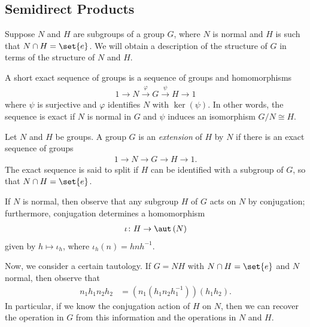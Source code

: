 \documentclass[10pt]{mypackage}
\begin{document}
\subsection{Semidirect Products}%
Suppose $N$ and $H$ are subgroups of a group $G$, where $N$ is normal and $H$ is such that $N\cap H = \set{e}$. We will obtain a description of the structure of $G$ in terms of the structure of $N$ and $H$.

A short exact sequence of groups is a sequence of groups and homomorphisms
\begin{align*}
  1 \rightarrow N \xrightarrow{\varphi} G \xrightarrow{\psi} H \rightarrow 1
\end{align*}
where $\psi$ is surjective and $\varphi$ identifies $N$ with $\ker\left( \psi \right)$. In other words, the sequence is exact if $N$ is normal in $G$ and $\psi$ induces an isomorphism $G/N\cong H$.
\begin{definition}
  Let $N$ and $H$ be groups. A group $G$ is an \textit{extension} of $H$ by $N$ if there is an exact sequence of groups
  \begin{align*}
    1 \rightarrow N\rightarrow G\rightarrow H\rightarrow 1.
  \end{align*}
  The exact sequence is said to split if $H$ can be identified with a subgroup of $G$, so that $N\cap H = \set{e}$.
\end{definition}
If $N$ is normal, then observe that any subgroup $H$ of $G$ acts on $N$ by conjugation; furthermore, conjugation determines a homomorphism
\begin{align*}
  \iota\colon H\rightarrow \aut\left( N \right)
\end{align*}
given by $h\mapsto \iota_h$, where $\iota_h(n) = hnh^{-1}$.

Now, we consider a certain tautology. If $G = NH$ with $N\cap H = \set{e}$ and $N$ normal, then observe that
\begin{align*}
  n_1h_1n_2h_2 &= \left( n_1\left( h_1n_2h_1^{-1} \right) \right)\left( h_1h_2 \right).
\end{align*}
In particular, if we know the conjugation action of $H$ on $N$, then we can recover the operation in $G$ from this information and the operations in $N$ and $H$.
\end{document}
